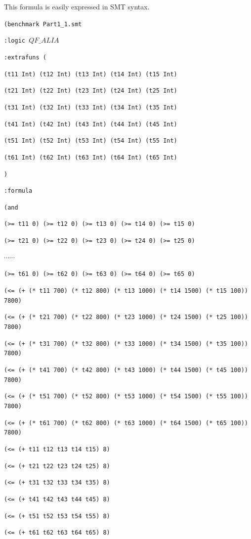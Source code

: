 \documentclass[11pt]{article}
\begin{document}
This formula is easily expressed in SMT syntax.

{\footnotesize

{\tt (benchmark Part1\_1.smt}

{\tt :logic $QF\_ALIA$}

{\tt :extrafuns (}

{\tt (t11 Int) (t12 Int) (t13 Int) (t14 Int) (t15 Int) }

{\tt (t21 Int) (t22 Int) (t23 Int) (t24 Int) (t25 Int) }

{\tt (t31 Int) (t32 Int) (t33 Int) (t34 Int) (t35 Int) }

{\tt (t41 Int) (t42 Int) (t43 Int) (t44 Int) (t45 Int) }

{\tt (t51 Int) (t52 Int) (t53 Int) (t54 Int) (t55 Int) }

{\tt (t61 Int) (t62 Int) (t63 Int) (t64 Int) (t65 Int) }

{\tt )}

{\tt :formula}

{\tt   (and}

{\tt (>= t11 0) (>= t12 0) (>= t13 0) (>= t14 0) (>= t15 0)}

{\tt (>= t21 0) (>= t22 0) (>= t23 0) (>= t24 0) (>= t25 0)}

$\cdots \cdots$

{\tt (>= t61 0) (>= t62 0) (>= t63 0) (>= t64 0) (>= t65 0) }

{\tt (<= (+ (* t11 700) (* t12 800) (* t13 1000) (* t14 1500) (* t15 100)) 7800)}

{\tt (<= (+ (* t21 700) (* t22 800) (* t23 1000) (* t24 1500) (* t25 100)) 7800)}

{\tt (<= (+ (* t31 700) (* t32 800) (* t33 1000) (* t34 1500) (* t35 100)) 7800)}

{\tt (<= (+ (* t41 700) (* t42 800) (* t43 1000) (* t44 1500) (* t45 100)) 7800)}

{\tt (<= (+ (* t51 700) (* t52 800) (* t53 1000) (* t54 1500) (* t55 100)) 7800)}

{\tt (<= (+ (* t61 700) (* t62 800) (* t63 1000) (* t64 1500) (* t65 100)) 7800) }

{\tt (<= (+ t11 t12 t13 t14 t15) 8)}

{\tt (<= (+ t21 t22 t23 t24 t25) 8)}

{\tt (<= (+ t31 t32 t33 t34 t35) 8)}

{\tt (<= (+ t41 t42 t43 t44 t45) 8)}

{\tt (<= (+ t51 t52 t53 t54 t55) 8)}

{\tt (<= (+ t61 t62 t63 t64 t65) 8)}

}
\end{document}
